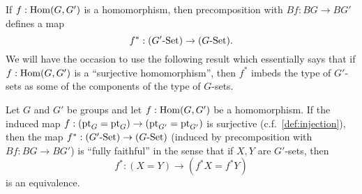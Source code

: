 If $f:\mathrm{Hom}(G,G')$ is a homomorphism, then precomposition with $Bf:BG\to BG'$ defines a map $$f^*:(G'\text{-}\mathord{\mathrm{Set}})\to(G\text{-}\mathord{\mathrm{Set}}).$$
We will have the occasion to use the following result which essentially says that if $f:\mathrm{Hom}(G,G')$ is a ``surjective homomorphism'', then $f^*$ imbeds the type of $G'$-sets as some of the components of the type of $G$-sets.
\begin{lemma}
  \label{lem:epifullyfaithful}
  Let $G$ and $G'$ be groups and let $f:\mathrm{Hom}(G,G')$ be a homomorphism.  If the induced map $f:(\mathrm{pt}_G=\mathrm{pt}_G)\to(\mathrm{pt}_{G'}=\mathrm{pt}_{G'})$ is surjective (c.f.~\cref{def:injection}), then the map $f^*:(G'\text{-}\mathord{\mathrm{Set}})\to(G\text{-}\mathord{\mathrm{Set}})$ (induced by precomposition with $Bf:BG\to BG'$) is ``fully faithful'' in the sense that if $X,Y$ are $G'$-sets, then
$$f^*:(X=Y)\to(f^*X=f^*Y)
$$
is an equivalence.
\end{lemma}
